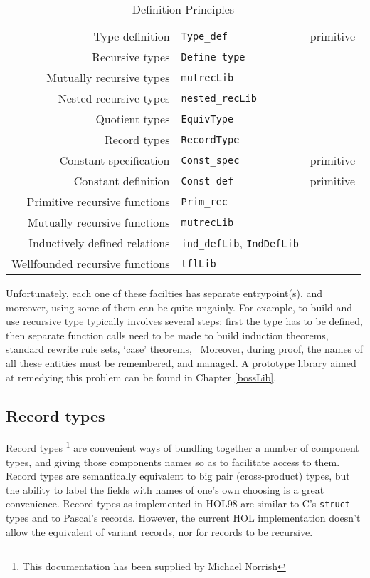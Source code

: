 \documentclass[12pt,fleqn,a4paper]{report}
\begin{document}
\begin{table}[ht]
\begin{center}
\begin{tabular}{|r|l|r|} \hline
Type definition & \verb+Type_def+ & primitive \\
Recursive types & \verb+Define_type+ &  \\
Mutually recursive types & \verb+mutrecLib+ & \\
Nested recursive types & \verb+nested_recLib+ & \\
Quotient types & \verb+EquivType+ & \\
Record types & \verb+RecordType+ & \\\hline
Constant specification & \verb+Const_spec+ & primitive \\
Constant definition & \verb+Const_def+ & primitive \\
Primitive recursive functions & \verb+Prim_rec+ & \\
Mutually recursive functions & \verb+mutrecLib+ & \\
Inductively defined relations & \verb+ind_defLib+,  \verb+IndDefLib+ & \\
Wellfounded recursive functions & \verb+tflLib+ & \\
 \hline
\end{tabular}
\caption{Definition Principles}\label{PoD}
\end{center}\end{table}

Unfortunately, each one of these facilties has separate entrypoint(s),
and moreover, using some of them can be quite ungainly. For example, to
build and use recursive type typically involves several steps: first the
type has to be defined, then separate function calls need to be made to
build induction theorems, standard rewrite rule sets, `case' theorems,
\etc\ Moreover, during proof, the names of all these entities must be
remembered, and managed. A prototype library aimed at remedying this
problem can be found in Chapter \ref{bossLib}.

\subsection{Record types}

Record types \footnote{This documentation has been supplied by Michael
Norrish} are convenient ways of bundling together a number of component
types, and giving those components names so as to facilitate access to
them.  Record types are semantically equivalent to big pair
(cross-product) types, but the ability to label the fields with names of
one's own choosing is a great convenience.  Record types as implemented
in HOL98 are similar to C's {\tt struct} types and to Pascal's records.
However, the current HOL implementation doesn't allow the equivalent of
variant records, nor for records to be recursive.
\end{document}
